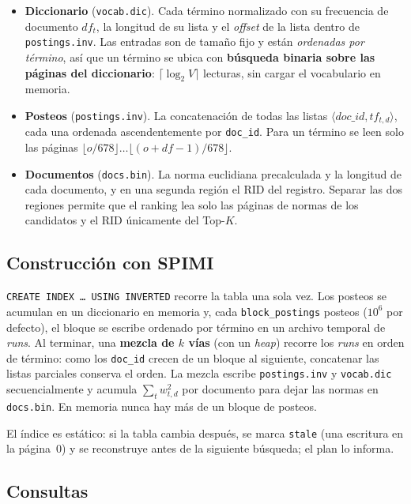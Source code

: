 \documentclass[11pt,a4paper]{article}
\newcommand{\code}[1]{\texttt{#1}}
\begin{document}
\begin{itemize}
\item \textbf{Diccionario} (\code{vocab.dic}). Cada término normalizado con su frecuencia de documento
  $df_t$, la longitud de su lista y el \emph{offset} de la lista dentro de \code{postings.inv}. Las
  entradas son de tamaño fijo y están \emph{ordenadas por término}, así que un término se ubica con
  \textbf{búsqueda binaria sobre las páginas del diccionario}: $\lceil\log_2 V\rceil$ lecturas, sin
  cargar el vocabulario en memoria.
\item \textbf{Posteos} (\code{postings.inv}). La concatenación de todas las listas $\langle
  doc\_id, tf_{t,d}\rangle$, cada una ordenada ascendentemente por \code{doc\_id}. Para un término se
  leen solo las páginas $\lfloor o/678\rfloor \dots \lfloor (o+df-1)/678\rfloor$.
\item \textbf{Documentos} (\code{docs.bin}). La norma euclidiana precalculada y la longitud de cada
  documento, y en una segunda región el RID del registro. Separar las dos regiones permite que el
  ranking lea solo las páginas de normas de los candidatos y el RID únicamente del Top-$K$.
\end{itemize}

\subsection{Construcción con SPIMI}

\code{CREATE INDEX \dots\ USING INVERTED} recorre la tabla una sola vez. Los posteos se acumulan en
un diccionario en memoria y, cada \code{block\_postings} posteos ($10^6$ por defecto), el bloque se
escribe ordenado por término en un archivo temporal de \emph{runs}. Al terminar, una \textbf{mezcla
de $k$ vías} (con un \emph{heap}) recorre los \emph{runs} en orden de término: como los \code{doc\_id}
crecen de un bloque al siguiente, concatenar las listas parciales conserva el orden. La mezcla escribe
\code{postings.inv} y \code{vocab.dic} secuencialmente y acumula $\sum_t w_{t,d}^2$ por documento
para dejar las normas en \code{docs.bin}. En memoria nunca hay más de un bloque de posteos.

El índice es estático: si la tabla cambia después, se marca \code{stale} (una escritura en la
página~0) y se reconstruye antes de la siguiente búsqueda; el plan lo informa.

\subsection{Consultas}
\end{document}
